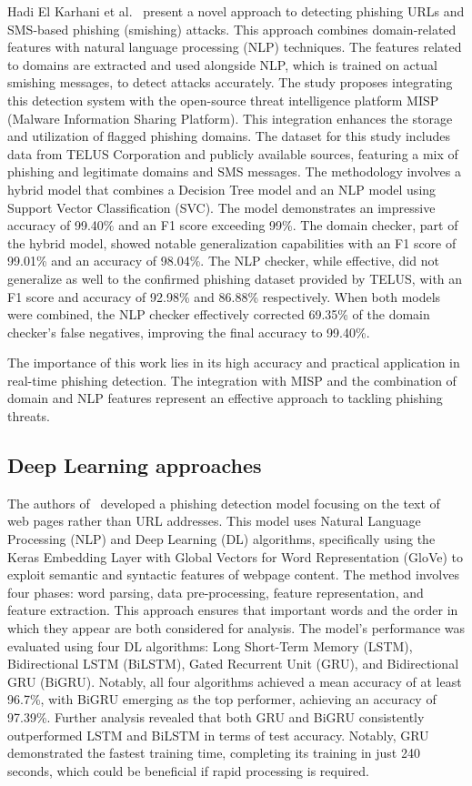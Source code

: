 Hadi El Karhani et al.~\cite{Karhani2023206} present a novel approach to detecting phishing URLs and SMS-based phishing (smishing) attacks. This approach combines domain-related features with natural language processing (NLP) techniques. The features related to domains are extracted and used alongside NLP, which is trained on actual smishing messages, to detect attacks accurately. The study proposes integrating this detection system with the open-source threat intelligence platform MISP (Malware Information Sharing Platform). This integration enhances the storage and utilization of flagged phishing domains.
The dataset for this study includes data from TELUS Corporation and publicly available sources, featuring a mix of phishing and legitimate domains and SMS messages. The methodology involves a hybrid model that combines a Decision Tree model and an NLP model using Support Vector Classification (SVC).
The model demonstrates an impressive accuracy of 99.40\% and an F1 score exceeding 99\%. The domain checker, part of the hybrid model, showed notable generalization capabilities with an F1 score of 99.01\% and an accuracy of 98.04\%.
The NLP checker, while effective, did not generalize as well to the confirmed phishing dataset provided by TELUS, with an F1 score and accuracy of 92.98\% and 86.88\% respectively.
When both models were combined, the NLP checker effectively corrected 69.35\% of the domain checker's false negatives, improving the final accuracy to 99.40\%.

The importance of this work lies in its high accuracy and practical application in real-time phishing detection. The integration with MISP and the combination of domain and NLP features represent an effective approach to tackling phishing threats.

\subsection{Deep Learning approaches}

The authors of~\cite{Benavides-Astudillo2023} developed a phishing detection model focusing on the text of web pages rather than URL addresses. This model uses Natural Language Processing (NLP) and Deep Learning (DL) algorithms, specifically using the Keras Embedding Layer with Global Vectors for Word Representation (GloVe) to exploit semantic and syntactic features of webpage content. The method involves four phases: word parsing, data pre-processing, feature representation, and feature extraction. This approach ensures that important words and the order in which they appear are both considered for analysis.
The model's performance was evaluated using four DL algorithms: Long Short-Term Memory (LSTM), Bidirectional LSTM (BiLSTM), Gated Recurrent Unit (GRU), and Bidirectional GRU (BiGRU). Notably, all four algorithms achieved a mean accuracy of at least 96.7\%, with BiGRU emerging as the top performer, achieving an accuracy of 97.39\%.
Further analysis revealed that both GRU and BiGRU consistently outperformed LSTM and BiLSTM in terms of test accuracy. Notably, GRU demonstrated the fastest training time, completing its training in just 240 seconds, which could be beneficial if rapid processing is required.

